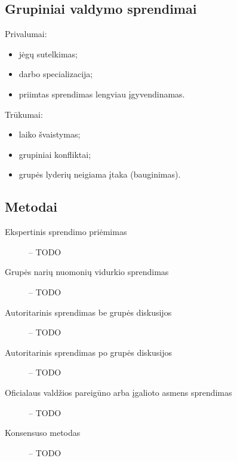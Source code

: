 \subsection{Grupiniai valdymo sprendimai}

Privalumai:
\begin{itemize}
  \item jėgų sutelkimas;
  \item darbo specializacija;
  \item priimtas sprendimas lengviau įgyvendinamas.
\end{itemize}

Trūkumai:
\begin{itemize}
  \item laiko švaistymas;
  \item grupiniai konfliktai;
  \item grupės lyderių neigiama įtaka (bauginimas).
\end{itemize}

\subsection{Metodai}

\begin{description}
  \item[Ekspertinis sprendimo priėmimas] – TODO
  \item[Grupės narių nuomonių vidurkio sprendimas] – TODO
  \item[Autoritarinis sprendimas be grupės diskusijos] – TODO
  \item[Autoritarinis sprendimas po grupės diskusijos] – TODO
  \item[Oficialaus valdžios pareigūno arba įgalioto asmens sprendimas] –
    TODO
  \item[Konsensuso metodas] – TODO
\end{description}
